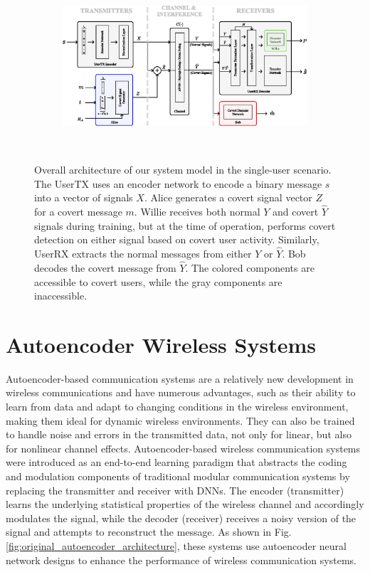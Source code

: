 \begin{figure}[thp]
	\center
	\begin{subfigure}{0.7\textwidth}
		\includegraphics[width=\linewidth]{figs/system_architecture}
	\end{subfigure}
	\\
	\caption{Overall architecture of our system model in the single-user scenario. The UserTX uses an encoder network to encode a binary message $s$ into a vector of signals $X$. Alice generates a covert signal vector $Z$ for a covert message $m$. Willie receives both normal $Y$ and covert $\hat{Y}$ signals during training, but at the time of operation, performs covert detection on either signal based on covert user activity. Similarly, UserRX extracts the normal messages from either $Y$ or $\hat{Y}$. Bob decodes the covert message from $\hat{Y}$. The colored components are accessible to covert users, while the gray components are inaccessible.}	
	\label{fig:system_architecture}
\end{figure}
\section{Autoencoder Wireless Systems}

Autoencoder-based communication systems are a relatively new development in wireless communications and have numerous advantages, such as their ability to learn from data and adapt to changing conditions in the wireless environment, making them ideal for dynamic wireless environments. They can also be trained to handle noise and errors in the transmitted data, not only for linear, but also for nonlinear channel effects. Autoencoder-based wireless communication systems were introduced as an end-to-end learning paradigm that abstracts the coding and modulation components of traditional modular communication systems by replacing the transmitter and receiver with DNNs. The encoder (transmitter) learns the underlying statistical properties of the wireless channel and accordingly modulates the signal, while the decoder (receiver) receives a noisy version of the signal and attempts to reconstruct the message. As shown in Fig. \ref{fig:original_autoencoder_architecture}, these systems use autoencoder neural network designs \cite{baldi2012autoencoders} to enhance the performance of wireless communication systems.


